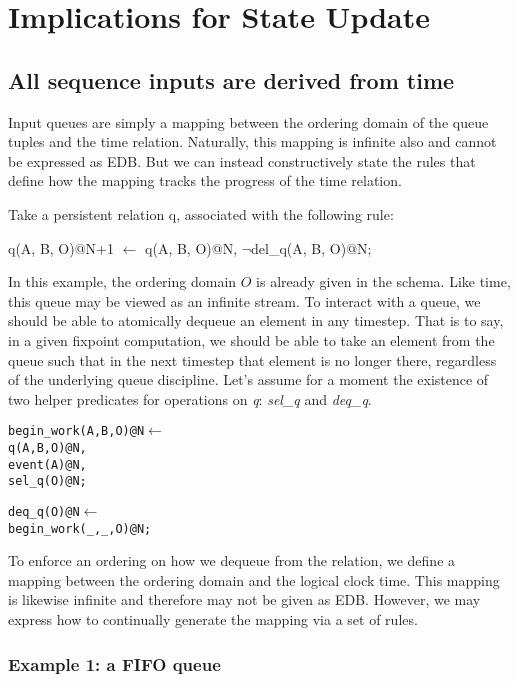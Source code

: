 \section{Implications for State Update}

\subsection{All sequence inputs are derived from time}

Input queues are simply a mapping between the ordering domain of the queue tuples and the time relation.  Naturally, this mapping
is infinite also and cannot be expressed as EDB.  But we can instead constructively state the rules that define how the mapping 
tracks the progress of the time relation.

Take a persistent relation q, associated with the following rule:

\begin{Dedalus}
q(A, B, O)@N+1 \(\leftarrow\)
  q(A, B, O)@N, 
  \(\lnot\)del\_q(A, B, O)@N;
\end{Dedalus}

In this example, the ordering domain $O$ is already given in the schema.  Like time, this queue may be viewed as an infinite stream.
To interact with a queue, we should be able to atomically dequeue an element in any timestep.  That is to say, in a given fixpoint computation,
we should be able to take an element from the queue such that in the next timestep that element is no longer there, regardless of the
underlying queue discipline.  Let's assume for a moment the existence of two helper predicates for operations on \emph{q}: \emph{sel\_q} and
\emph{deq\_q}.  


\begin{alltt}
begin_work(A, B, O)@N \(\leftarrow\)
  q(A, B, O)@N,
  event(A)@N, 
  sel_q(O)@N;
  
  
deq_q(O)@N \(\leftarrow\) 
  begin_work(_, _, O)@N;
\end{alltt}


To enforce an ordering on how we dequeue from the relation, we define a mapping between the ordering domain and the logical clock
time.  This mapping is likewise infinite and therefore may not be given as EDB.  However, we may express how to continually generate 
the mapping via a set of rules.

\subsubsection{Example 1: a FIFO queue}

